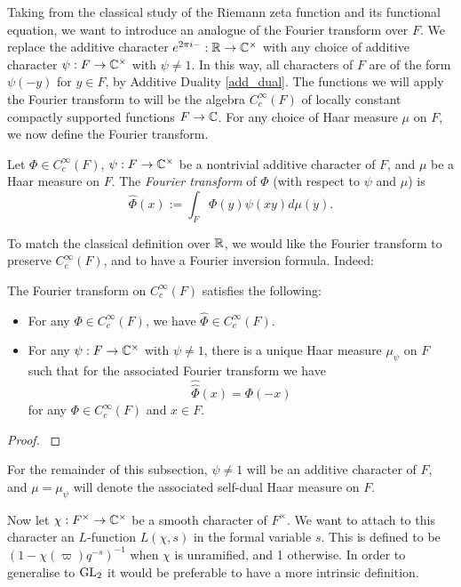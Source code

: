 Taking from the classical study of the Riemann zeta function and its functional equation, we want to introduce an analogue of the Fourier transform over $F$. We replace the additive character $e^{2\pi i -}: \mathbb{R} \to \mathbb{C}^\times$ with any choice of additive character $\psi: F \to \mathbb{C}^\times$ with $\psi \neq 1$. In this way, all characters of $F$ are of the form $\psi(-y)$ for $y \in F$, by Additive Duality \ref{add_dual}. The functions we will apply the Fourier transform to will be the algebra $C_c^\infty(F)$ of locally constant compactly supported functions $F \to \mathbb{C}$. For any choice of Haar measure $\mu$ on $F$, we now define the Fourier transform.

\begin{defn}
    Let $\Phi \in C_c^\infty(F)$, $\psi:F \to \mathbb{C}^\times$ be a nontrivial additive character of $F$, and $\mu$ be a Haar measure on $F$. The \textit{Fourier transform} of $\Phi$ (with respect to $\psi$ and $\mu$) is 
    $$\hat{\Phi}(x) := \int_F \Phi(y)\psi(xy) d\mu(y).$$
\end{defn}

To match the classical definition over $\mathbb{R}$, we would like the Fourier transform to preserve $C_c^\infty(F)$, and to have a Fourier inversion formula. Indeed:

\begin{prop}
    The Fourier transform on $C_c^\infty(F)$ satisfies the following:
    \begin{itemize}
        \item For any $\Phi \in C_c^\infty(F)$, we have $\hat{\Phi} \in C_c^\infty(F)$.
        \item For any $\psi: F \to \mathbb{C}^\times$ with $\psi \neq 1$, there is a unique Haar measure $\mu_\psi$ on $F$ such that for the associated Fourier transform we have $$\hat{\hat{\Phi}}(x) = \Phi(-x)$$ for any $\Phi \in C_c^\infty(F)$ and $x \in F$.
    \end{itemize}
    
\end{prop}
\begin{proof}
    \cite[Proposition 23.1]{BH1}
\end{proof}

\begin{notn}
    For the remainder of this subsection, $\psi \neq 1$ will be an additive character of $F$, and $\mu= \mu_\psi$ will denote the associated self-dual Haar measure on $F$.
\end{notn}


Now let $\chi: F^\times \to \mathbb{C}^\times$ be a smooth character of $F^\times$. We want to attach to this character an $L$-function $L(\chi,s)$ in the formal variable $s$. This is defined to be $(1-\chi(\varpi)q^{-s})^{-1}$ when $\chi$ is unramified, and 1 otherwise. In order to generalise to $\mathrm{GL}_2$ it would be preferable to have a more intrinsic definition.

